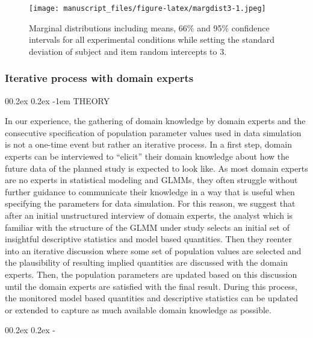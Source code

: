 \documentclass[
  man,floatsintext]{apa6}
\makeatletter
\let\oldparagraph\paragraph
\renewcommand{\paragraph}[1]{\oldparagraph{#1}\mbox{}}
\let\oldsubparagraph\subparagraph
\renewcommand{\subparagraph}[1]{\oldsubparagraph{#1}\mbox{}}
\renewcommand{\paragraph}{\@startsection{paragraph}{4}{\parindent}%
  {0\baselineskip \@plus 0.2ex \@minus 0.2ex}%
  {-1em}%
  {\normalfont\normalsize\bfseries\itshape\typesectitle}}
\renewcommand{\subparagraph}[1]{\@startsection{subparagraph}{5}{1em}%
  {0\baselineskip \@plus 0.2ex \@minus 0.2ex}%
  {-\z@\relax}%
  {\normalfont\normalsize\itshape\hspace{\parindent}{#1}\textit{\addperi}}{\relax}}
\makeatother
\begin{document}
\begin{figure}
\centering
\texttt{[image: manuscript\_files/figure-latex/margdist3-1.jpeg]}
\caption{\label{fig:margdist3}Marginal distributions including means, 66\% and 95\% confidence intervals for all experimental conditions while setting the standard deviation of subject and item random intercepts to 3.}
\end{figure}

\hypertarget{iterative-process-with-domain-experts}{%
\subsubsection{Iterative process with domain experts}\label{iterative-process-with-domain-experts}}

\hypertarget{theory-5}{%
\paragraph{THEORY}\label{theory-5}}

In our experience, the gathering of domain knowledge by domain experts and the consecutive specification of population parameter values used in data simulation is not a one-time event but rather an iterative process.
In a first step, domain experts can be interviewed to ``elicit'' their domain knowledge about how the future data of the planned study is expected to look like.
As most domain experts are no experts in statistical modeling and GLMMs, they often struggle without further guidance to communicate their knowledge in a way that is useful when specifying the parameters for data simulation.
For this reason, we suggest that after an initial unstructured interview of domain experts, the analyst which is familiar with the structure of the GLMM under study selects an initial set of insightful descriptive statistics and model based quantities.
Then they reenter into an iterative discussion where some set of population values are selected and the plausibility of resulting implied quantities are discussed with the domain experts.
Then, the population parameters are updated based on this discussion until the domain experts are satisfied with the final result.
During this process, the monitored model based quantities and descriptive statistics can be updated or extended to capture as much available domain knowledge as possible.

\hypertarget{practice-5}{%
\subparagraph{PRACTICE}\label{practice-5}}
\end{document}

